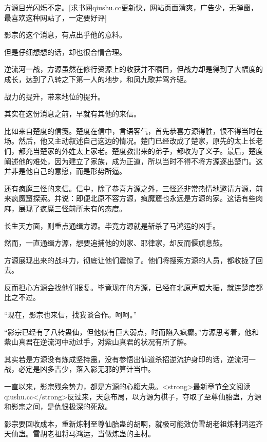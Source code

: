 
\begin{this_body}

方源目光闪烁不定。[求书网qiushu.cc更新快，网站页面清爽，广告少，无弹窗，最喜欢这种网站了，一定要好评]

影宗的这个消息，有点出乎他的意料。

但是仔细想想的话，却也很合情合理。

逆流河一战，方源虽然在修行资源上的收获并不瞩目，但战力却是得到了大幅度的成长，达到了八转之下第一人的地步，和凤九歌并驾齐驱。

战力的提升，带来地位的提升。

其实在这份消息之前，早就有其他的来信。

比如来自楚度的信笺。楚度在信中，言语客气，首先恭喜方源得胜，恨不得当时在场。然后，他又主动叙述自己这边的情况。楚门已经改成了楚家，原先的太上长老们，都充当楚家的外姓太上家老。楚度教出来的弟子，都收为了义子。最后，楚度阐述他的难处，因为建立了家族，成为正道，所以当时不得不将方源逐出楚门。这并非是他自己的意愿，而是形势所逼。

还有疯魔三怪的来信。信中，除了恭喜方源之外，三怪还非常热情地邀请方源，前来疯魔窟探索。并说：即便北原不容方源，疯魔窟也永远是方源的家。这话有些肉麻，展现了疯魔三怪前所未有的态度。

长生天方面，则重点通缉方源。毕竟方源就是斩杀了马鸿运的凶手。

然而，一直通缉方源，想要追捕他的刘家、耶律家，却反而偃旗息鼓。

方源展现出来的战斗力，彻底让他们震惊了。他们将搜索方源的人员，都收拢了回去。

反而担心方源会找他们报复。毕竟现在的方源，已经在北原声威大振，就连楚度都比之不过。

“现在，影宗也来信，找我谈合作。呵呵。”

“影宗已经有了八转蛊仙，但他似有巨大弱点，时而陷入疯癫。”方源思考着，他和紫山真君在逆流河中动过手，对紫山真君的状况有所了解。

其实若是方源没有炼成坚持蛊，没有参悟出仙道杀招逆流护身印的话，逆流河一战，必定是凶多吉少，落入影无邪的算计当中。

一直以来，影宗残余势力，都是方源的心腹大患。<strong>最新章节全文阅读qiushu.cc</strong>反过来，天意布局，以方源为棋子，夺取了至尊仙胎蛊，方源和影宗之间，是仇恨极深的死敌。

影宗要回收成本，重新炼制至尊仙胎蛊的胡啊，就极可能效仿雪胡老祖炼制鸿运齐天仙蛊。雪胡老祖将马鸿运，当做炼蛊的主材。


\end{this_body}
